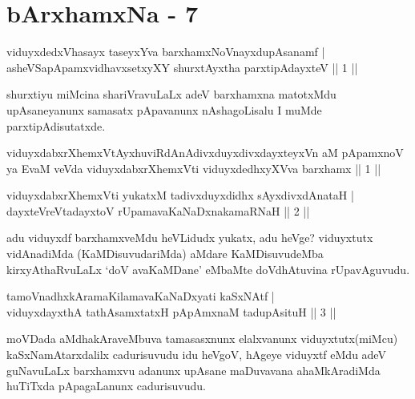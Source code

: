 \chapter{bArxhamxNa - 7}

\begin{shl}
viduyxdedxVhasayx taseyxYva barxhamxNoV\s nayxdupAsanamf | \\
asheVSapApamxvidhavxsetxyXY shurxtAyx\s tha parxtipAdayxteV \hfill ||  1 || 
\end{shl}

\begin{artha}
shurxtiyu miMcina shariVravuLaLx adeV barxhamxna matotxMdu upAsaneyanunx samasatx pApavanunx nAshagoLisalu I muMde parxtipAdisutatxde.
\end{artha}

\begin{kandikeshl}
viduyxdabxrXhemxVtAyxhuviRdAnAdivxduyxdivxdayxteyxVn aM pApamxnoV ya EvaM veVda viduyxdabxrXhemxVti viduyxdedhxyXVva barxhamx || 1 ||
\end{kandikeshl}


\begin{shl}
viduyxdabxrXhemxVti yukatxM tadivxduyxdidhx sAyxdivxdAnataH | \\
dayxteVreVtadayxtoV rUpamavaKaNaDxnakamaRNaH \hfill ||  2 || 
\end{shl}

\begin{artha}
adu viduyxdf barxhamxveMdu heVLidudx yukatx, adu heVge? viduyxtutx vidAnadiMda (KaMDisuvudariMda) aMdare KaMDisuvudeMba kirxyAthaRvuLaLx `doV avaKaMDane' eMbaMte doVdhAtuvina rUpavAguvudu.
\end{artha}

\begin{shl}
tamoV\s nadhxkAramaKilamavaKaNaDxyati kaSxNAtf  | \\
viduyxdayxthA tathA\s samxtatxH pApAmxnaM tadupAsituH \hfill ||  3 ||
\end{shl}

\begin{artha}
moVDada aMdhakAraveMbuva tamasasxnunx elalxvanunx viduyxtutx\break (miMcu) kaSxNamAtarxdalilx cadurisuvudu idu heVgoV, hAgeye viduyxtf eMdu adeV guNavuLaLx barxhamxvu adanunx upAsane maDuvavana ahaMkAradiMda huTiTxda pApagaLanunx cadurisuvudu.
\end{artha}

